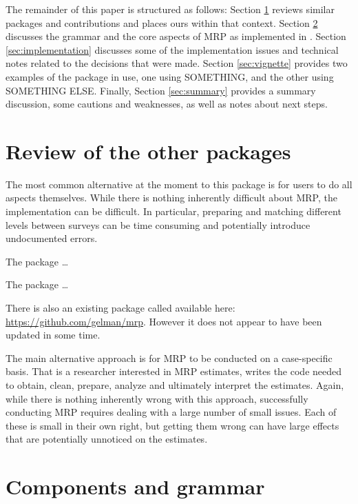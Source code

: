 \documentclass[
]{jss}
\begin{document}
The remainder of this paper is structured as follows: Section
\ref{sec:review} reviews similar packages and contributions and places
ours within that context. Section \ref{sec:components} discusses the
grammar and the core aspects of MRP as implemented in .
Section \ref{sec:implementation} discusses some of the implementation
issues and technical notes related to the decisions that were made.
Section \ref{sec:vignette} provides two examples of the package in use,
one using SOMETHING, and the other using SOMETHING ELSE. Finally,
Section \ref{sec:summary} provides a summary discussion, some cautions
and weaknesses, as well as notes about next steps.

\section{Review of the other packages} \label{sec:review}

The most common alternative at the moment to this package is for users
to do all aspects themselves. While there is nothing inherently
difficult about MRP, the implementation can be difficult. In particular,
preparing and matching different levels between surveys can be time
consuming and potentially introduce undocumented errors.

The  package \citep[\citet{lumleytwo},
\citet{lumleythree}]{lumleyone} \ldots{}

The  package \citep{citeDeclareDesign}\ldots{}

There is also an existing package called  available here:
\url{https://github.com/gelman/mrp}. However it does not appear to have
been updated in some time.

The main alternative approach is for MRP to be conducted on a
case-specific basis. That is a researcher interested in MRP estimates,
writes the code needed to obtain, clean, prepare, analyze and ultimately
interpret the estimates. Again, while there is nothing inherently wrong
with this approach, successfully conducting MRP requires dealing with a
large number of small issues. Each of these is small in their own right,
but getting them wrong can have large effects that are potentially
unnoticed on the estimates.

\section{Components and grammar} \label{sec:components}
\end{document}

